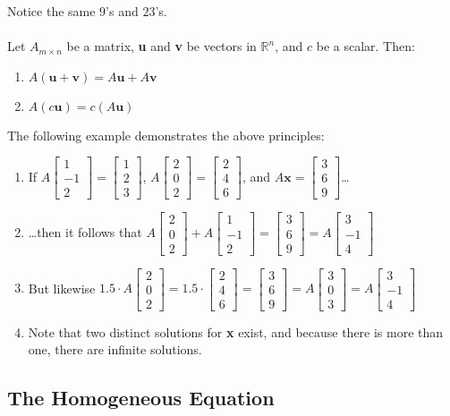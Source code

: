 \documentclass[12pt]{article}
\newcommand{\R}{\mathbb{R}}
\newcommand{\bt}[1]{\textbf{{#1}}}
\newcommand{\bm}[1]{\mathbf{{#1}}}
\newcommand{\mb}{\begin{bmatrix}}
\newcommand{\me}{\end{bmatrix}}
\begin{document}
Notice the same $9$'s and $23$'s. \\ \\

Let $A_{m\times n}$ be a matrix, \bt{u} and \bt{v} be vectors in $\R^n$, and $c$ be a scalar. Then:

\begin{enumerate}
    \item $A(\bm{u} + \bm{v}) = A\bm{u} + A\bm{v}$
    \item $A(c\bm{u}) = c(A\bm{u})$
\end{enumerate}

The following example demonstrates the above principles:
\begin{enumerate}
    \item If $A\mb 1\\-1\\2\me = \mb1\\2\\3\me$, $A\mb2\\0\\2\me = \mb2\\4\\6\me$, and $A\bm{x} = \mb3\\6\\9\me$\dots
    \item \dots then it follows that $A\mb2\\0\\2\me + A\mb 1\\-1\\2\me = \mb3\\6\\9\me = A\mb3\\-1\\4\me$
    \item But likewise $1.5 \cdot A\mb2\\0\\2\me = 1.5\cdot\mb2\\4\\6\me = \mb3\\6\\9\me = A\mb3\\0\\3\me = A\mb3\\-1\\4\me$
    \item Note that two distinct solutions for \bt{x} exist, and because there is more than one, there are infinite solutions.
\end{enumerate}

\subsection*{The Homogeneous Equation}
\end{document}
